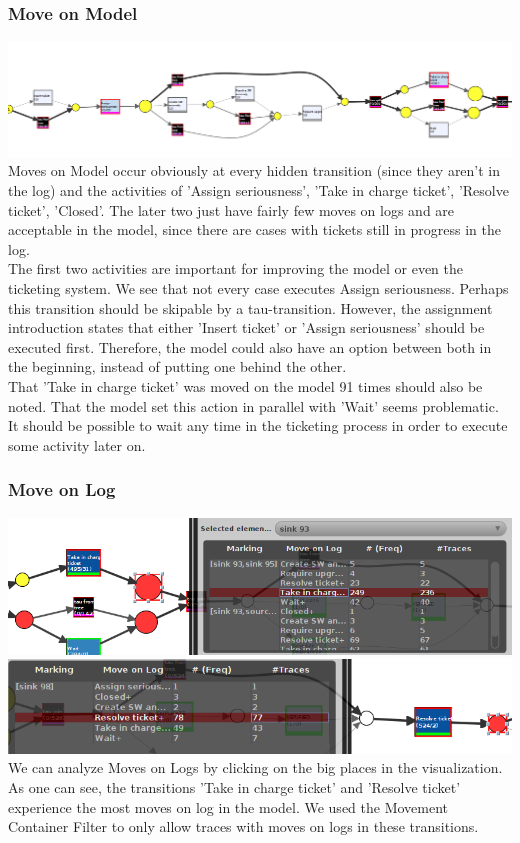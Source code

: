 \documentclass[../../main.tex]{subfiles}
\begin{document}
\subsubsection*{Move on Model}
\includegraphics[width=\columnwidth]{img/ProM_c_Move_on_Model.png} \\
Moves on Model occur obviously at every hidden transition (since they aren't in the log) and the activities of 'Assign seriousness', 'Take in charge ticket', 'Resolve ticket', 'Closed'. The later two just have fairly few moves on logs and are acceptable in the model, since there are cases with tickets still in progress in the log. \\
The first two activities are important for improving the model or even the ticketing system. We see that not every case executes Assign seriousness. Perhaps this transition should be skipable by a tau-transition. However, the assignment introduction states that either 'Insert ticket' or 'Assign seriousness' should be executed first. Therefore, the model could also have an option between both in the beginning, instead of putting one behind the other. \\
That 'Take in charge ticket' was moved on the model 91 times should also be noted. That the model set this action in parallel with 'Wait' seems problematic. It should be possible to wait any time in the ticketing process in order to execute some activity later on.

\subsubsection*{Move on Log}
\includegraphics[width=\columnwidth]{img/ProM_c_Move_on_Log_1.png} \\
\includegraphics[width=\columnwidth]{img/ProM_c_Move_on_Log_2.png} \\
We can analyze Moves on Logs by clicking on the big places in the visualization. As one can see, the transitions 'Take in charge ticket' and 'Resolve ticket' experience the most moves on log in the model. We used the Movement Container Filter to only allow traces with moves on logs in these transitions.
\end{document}
